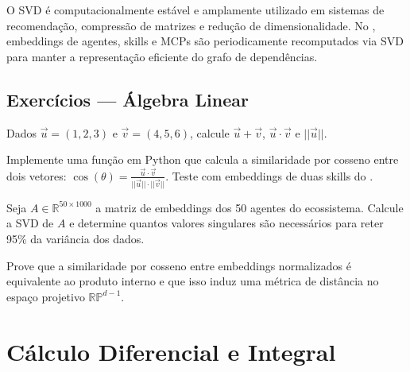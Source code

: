 \begin{observacao}
    O SVD é computacionalmente estável e amplamente utilizado em sistemas de
    recomendação, compressão de matrizes e redução de dimensionalidade. No
    \opencodeeco{}, embeddings de agentes, skills e MCPs são periodicamente
    recomputados via SVD para manter a representação eficiente do grafo de
    dependências.
\end{observacao}

\subsection{Exercícios — Álgebra Linear}

\begin{exercicio}
    Dados $\vec{u} = (1, 2, 3)$ e $\vec{v} = (4, 5, 6)$, calcule
    $\vec{u} + \vec{v}$, $\vec{u} \cdot \vec{v}$ e $||\vec{u}||$.
\end{exercicio}

\begin{exercicio}
    Implemente uma função em Python que calcula a similaridade por cosseno
    entre dois vetores: $\cos(\theta) = \frac{\vec{u} \cdot \vec{v}}
    {||\vec{u}|| \cdot ||\vec{v}||}$. Teste com embeddings de duas skills
    do \opencodeeco{}.
\end{exercicio}

\begin{exercicio}
    Seja $A \in \mathbb{R}^{50 \times 1000}$ a matriz de embeddings dos 50
    agentes do ecossistema. Calcule a SVD de $A$ e determine quantos valores
    singulares são necessários para reter 95\% da variância dos dados.
\end{exercicio}

\begin{exercicio}
    Prove que a similaridade por cosseno entre embeddings normalizados é
    equivalente ao produto interno e que isso induz uma métrica de distância
    no espaço projetivo $\mathbb{RP}^{d-1}$.
\end{exercicio}

\section{Cálculo Diferencial e Integral}
\label{sec:calculo}
\nivelintermediario

